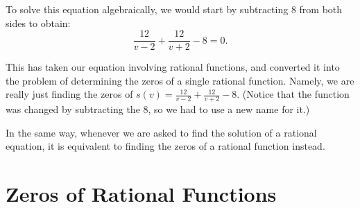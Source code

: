 \documentclass[nooutcomes]{ximera}
\begin{document}
	To solve this equation algebraically, we would start by subtracting $8$ from both sides to obtain:
	$$ \frac{12}{v-2}+\frac{12}{v+2}-8 = 0. $$
	
	This has taken our equation involving rational functions, and converted it into the problem of determining the zeros of a single rational function. 
	Namely, we are really just finding the zeros of $s(v) = \frac{12}{v-2}+\frac{12}{v+2}-8$. 
	(Notice that the function was changed by subtracting the $8$, so we had to use a new name for it.)
	
	In the same way, whenever we are asked to find the solution of a rational equation, it is equivalent to finding the zeros of a rational function instead.



\section{Zeros of Rational Functions}
\end{document}
